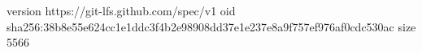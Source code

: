 version https://git-lfs.github.com/spec/v1
oid sha256:38b8e55e624cc1e1ddc3f4b2e98908dd37e1e237e8a9f757ef976af0cdc530ac
size 5566
